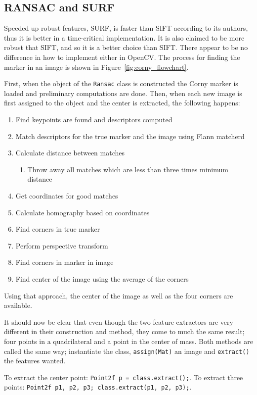 \subsection{RANSAC and \textsc{SURF}}

Speeded up robust features, \textsc{SURF}, is faster than \textsc{SIFT} according to its authors\cite{WikiSURF}, thus it is better in a time-critical implementation.
It is also claimed to be more robust that \textsc{SIFT}, and so it is a better choice than SIFT.\@
There appear to be no difference in how to implement either in OpenCV.\@
The process for finding the marker in an image is shown in Figure~\vref{fig:corny_flowchart}.

First, when the object of the \verb|Ransac| class is constructed the Corny marker is loaded and preliminary computations are done.
Then, when each new image is first assigned to the object and the center is extracted, the following happens:
\begin{enumerate}
    \item Find keypoints are found and descriptors computed
    \item Match descriptors for the true marker and the image using Flann matcherd
    \item Calculate distance between matches
    \begin{enumerate}
    \item Throw away all matches which are less than three times minimum distance
    \end{enumerate}
    \item Get coordinates for good matches
    \item Calculate homography based on coordinates
    \item Find corners in true marker
    \item Perform perspective transform
    \item Find corners in marker in image
    \item Find center of the image using the average of the corners
\end{enumerate}

Using that approach, the center of the image as well as the four corners are available.

It should now be clear that even though the two feature extractors are very different in their construction and method,
they come to much the same result; four points in a quadrilateral and a point in the center of mass.
Both methods are called the same way; instantiate the class, \verb|assign(Mat)| an image and \verb|extract()| the features wanted.

To extract the center point: \verb|Point2f p = class.extract();|.
To extract three points: \verb|Point2f p1, p2, p3; class.extract(p1, p2, p3);|.
